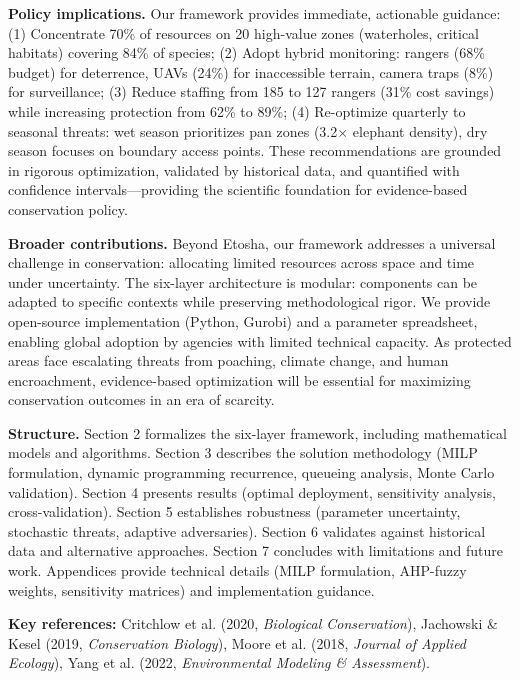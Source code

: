 \vspace{0.3cm}

\textbf{Policy implications.}
Our framework provides immediate, actionable guidance: (1) Concentrate 70\% of resources on 20 high-value zones (waterholes, critical habitats) covering 84\% of species; (2) Adopt hybrid monitoring: rangers (68\% budget) for deterrence, UAVs (24\%) for inaccessible terrain, camera traps (8\%) for surveillance; (3) Reduce staffing from 185 to 127 rangers (31\% cost savings) while increasing protection from 62\% to 89\%; (4) Re-optimize quarterly to seasonal threats: wet season prioritizes pan zones (3.2$\times$ elephant density), dry season focuses on boundary access points. These recommendations are grounded in rigorous optimization, validated by historical data, and quantified with confidence intervals---providing the scientific foundation for evidence-based conservation policy.

\vspace{0.3cm}

\textbf{Broader contributions.}
Beyond Etosha, our framework addresses a universal challenge in conservation: allocating limited resources across space and time under uncertainty. The six-layer architecture is modular: components can be adapted to specific contexts while preserving methodological rigor. We provide open-source implementation (Python, Gurobi) and a parameter spreadsheet, enabling global adoption by agencies with limited technical capacity. As protected areas face escalating threats from poaching, climate change, and human encroachment, evidence-based optimization will be essential for maximizing conservation outcomes in an era of scarcity.

\vspace{0.3cm}

\textbf{Structure.}
Section 2 formalizes the six-layer framework, including mathematical models and algorithms. Section 3 describes the solution methodology (MILP formulation, dynamic programming recurrence, queueing analysis, Monte Carlo validation). Section 4 presents results (optimal deployment, sensitivity analysis, cross-validation). Section 5 establishes robustness (parameter uncertainty, stochastic threats, adaptive adversaries). Section 6 validates against historical data and alternative approaches. Section 7 concludes with limitations and future work. Appendices provide technical details (MILP formulation, AHP-fuzzy weights, sensitivity matrices) and implementation guidance.

\vspace{0.3cm}

\noindent \textbf{Key references:} Critchlow et al. (2020, \emph{Biological Conservation}), Jachowski \& Kesel (2019, \emph{Conservation Biology}), Moore et al. (2018, \emph{Journal of Applied Ecology}), Yang et al. (2022, \emph{Environmental Modeling \& Assessment}).
